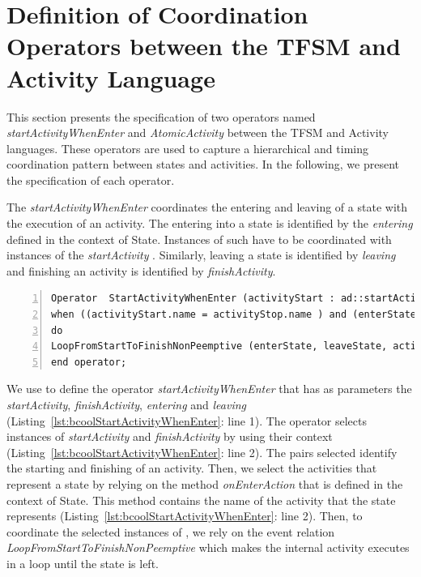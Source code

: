 \section{Definition of Coordination Operators between the TFSM and Activity Language}
This section presents the \bcool specification of two operators named \emph{startActivityWhenEnter} and \emph{AtomicActivity} between the TFSM and Activity languages. These operators are used to capture a hierarchical and timing coordination pattern between states and activities. In the following, we present the \bcool specification of each operator.    

The \emph{startActivityWhenEnter} coordinates the entering and leaving of a state with the execution of an activity. The entering into a state is identified by the \textit{entering} \dse defined in the context of State. Instances of such \dse have to be coordinated with instances of the \textit{startActivity} \dse. Similarly, leaving a state is identified by \dse \textit{leaving} and finishing an activity is identified by \dse \textit{finishActivity}. 

\begin{lstlisting}[language=bcool,
caption={Hierarchical operator between TFSM and Activity languages},
label={lst:bcoolStartActivityWhenEnter}, 
basicstyle=\scriptsize\ttfamily, backgroundcolor=\color{LGrey}, numbers=left, xleftmargin=2pt]
Operator  StartActivityWhenEnter (activityStart : ad::startActivity , activityStop : ad::finishActivity, enterState : tfsm::entering, leaveState : tfsm::leaving)
when ((activityStart.name = activityStop.name ) and (enterState.name = leaveState.name) and (activityStart.name = enterState.onEnterAction.name));
do 
LoopFromStartToFinishNonPeemptive (enterState, leaveState, activityStart, activityStop)
end operator;
\end{lstlisting}

We use \bcool to define the operator \emph{startActivityWhenEnter} that has as parameters the \dse \textit{startActivity}, \textit{finishActivity}, \textit{entering} and \textit{leaving} (Listing~\ref{lst:bcoolStartActivityWhenEnter}: line 1). The operator selects instances of \dse \emph{startActivity} and \emph{finishActivity} by using their context (Listing~\ref{lst:bcoolStartActivityWhenEnter}: line 2). The pairs selected identify the starting and finishing of an activity. Then, we select the activities that represent a state by relying on the method \emph{onEnterAction} that is defined in the context of State. This method contains the name of the activity that the state represents (Listing~\ref{lst:bcoolStartActivityWhenEnter}: line 2). Then, to coordinate the selected instances of \dse, we rely on the event relation \emph{LoopFromStartToFinishNonPeemptive} which makes the internal activity executes in a loop until the state is left. 


